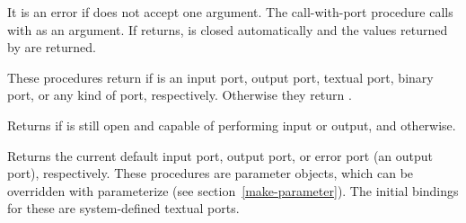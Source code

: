 \begin{entry}{%
}

It is an error if  does not accept one argument.  The {\cf call-with-port}
procedure calls  with  as an argument.  If
 returns,  is closed automatically and the values
returned by  are returned.

\end{entry}

\begin{entry}{%
}

These procedures return \schtrue{} if  is an input port, output port, 
textual port, binary port, or any
kind of port, respectively.  Otherwise they return \schfalse.

\end{entry}


\begin{entry}{%
}

Returns \schtrue{} if  is still open and capable of
performing input or output, and \schfalse{} otherwise.


\end{entry}


\begin{entry}{%
}

Returns the current default input port, output port, or error port (an
output port), respectively.  These procedures are parameter objects, which can be
overridden with {\cf parameterize} (see
section~\ref{make-parameter}). The initial bindings for these
are system-defined textual ports.

\end{entry}


